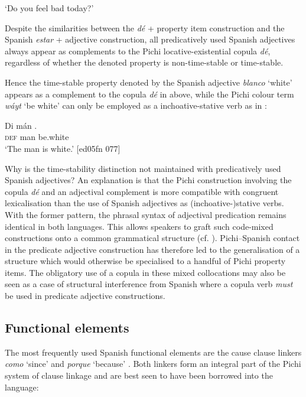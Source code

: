 \glt ‘Do you feel bad today?’
\z

Despite the similarities between the \textit{dé} + property item construction and the Spanish \textit{estar} + adjective construction, all predicatively used Spanish adjectives always appear as complements to the Pichi locative-existential copula \textit{dé}, regardless of whether the denoted property is non-time-stable or time-stable. 


Hence the time-stable property denoted by the Spanish adjective \textit{blanco} ‘white’ appears as a complement to the copula \textit{dé} in  above, while the Pichi colour term \textit{wáyt} ‘be white’ can only be employed as a inchoative-stative verb as in :



\ea%
    \label{ex:key:1722}
    \gll Di  mán    .\\
\textsc{def}  man    be.white\\

\glt ‘The man is white.’ [ed05fn 077]
\z

Why is the time-stability distinction not maintained with predicatively used Spanish adjectives? An explanation is that the Pichi construction involving the copula \textit{dé} and an adjectival complement is more compatible with congruent lexicalisation than the use of Spanish adjectives as (inchoative-)stative verbs. With the former pattern, the phrasal syntax of adjectival predication remains identical in both languages. This allows speakers to graft such code-mixed constructions onto a common grammatical structure (cf. \citealt{MeechanPoplack1995}). Pichi–Spanish contact in the predicate adjective construction has therefore led to the generalisation of a structure which would otherwise be specialised to a handful of Pichi property items. The obligatory use of a copula in these mixed collocations may also be seen as a case of structural interference from Spanish where a copula verb \textit{must} be used in predicate adjective constructions. 

\subsection{Functional elements}\label{sec:13.2.3}

The most frequently used Spanish functional elements are the cause clause linkers \textit{como} ‘since’  and \textit{porque} ‘because’ . Both linkers form an integral part of the Pichi system of clause linkage and are best seen to have been borrowed into the language:


